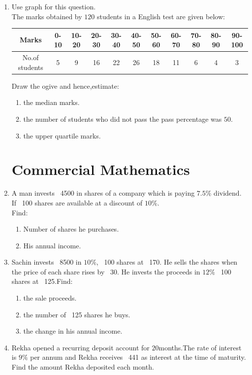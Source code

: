 \documentclass[12pt,-letter paper]{article}
\newcommand{\percent}{\%}
\begin{document}
\begin{enumerate}
\item Use graph for this question.\\
The marks obtained by $120$ students in a English test are given below:
\begin{table}[h!]
    \centering
    \small  %
    \begin{tabular}{|c|c|c|c|c|c|c|c|c|c|c|}
        \hline
        Marks  & 0-10 & 10-20 & 20-30 & 30-40 & 40-50 & 50-60 & 60-70 & 70-80 & 80-90 & 90-100\\
        \hline
        No.of students &5&9&16&22&26&18&11&6&4&3\\
        \hline
    \end{tabular}
\end{table} 
       \text Draw the ogive and hence,estimate:
       \begin{enumerate}
           \item the median marks.
           \item the number of students who did not pass the pass percentage was $50$.
           \item the upper quartile marks.
       \end{enumerate}

\begin{center}
    \section*{Commercial Mathematics}
\end{center}

\item A man invests \rupee~4500  in shares of a company which is paying $7.5\percent$ dividend. \\
      If \rupee~100 shares are available at a discount of $10\percent$.\\
      Find:
      \begin{enumerate}
	\item Number of shares he purchases.
	\item His annual income.
      \end{enumerate}

\item Sachin invests \rupee~8500 in $10\percent$, \rupee~100 shares at \rupee~170. He sells the shares when the price of each share rises by \rupee~30. He invests the proceeds in $12\percent$ \rupee~100 shares at \rupee~125.Find:
\begin{enumerate}
    \item the sale proceeds.
    \item the number of \rupee~125 shares he buys.
    \item the change in his annual income.
\end{enumerate}
\item Rekha opened a recurring deposit account for $20$months.The rate of interest is $9\percent$ per annum and Rekha receives \rupee~441 as interest at the time of maturity.\\
Find the amount Rekha deposited each month.
\end{enumerate}
\end{document}
